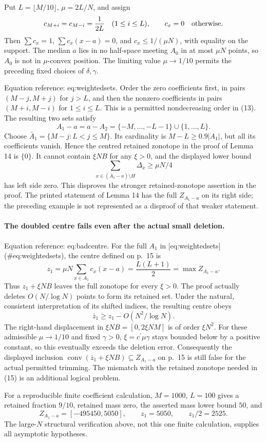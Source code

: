 \documentclass[10pt]{article}
\begin{document}
Put \(L=\lfloor M/10\rfloor\), \(\mu=2L/N\), and assign \[c_{M+i}=c_{M-i}=\frac1{2L}\quad(1\le i\le L),\qquad c_x=0
 \quad\hbox{otherwise}.\] Then \(\sum c_x=1\), \(\sum c_x(x-a)=0\), and \(c_x\le1/(\mu N)\), with equality on the support. The median \(a\) lies in no half-space meeting \(A_0\) in at most \(\mu N\) points, so \(A_0\) is not in \(\mu\)-convex position. The limiting value \(\mu\to1/10\) permits the preceding fixed choices of \(\delta,\gamma\).\par
Equation reference: eq:weightedsets. Order the zero coefficients first, in pairs \((M-j,M+j)\) for \(j>L\), and then the nonzero coefficients in pairs \((M+i,M-i)\) for \(1\le i\le L\). This is a permitted nondecreasing order in (13). The resulting two sets satisfy \[
 A_1-a=a-A_2=\{-M,\ldots,-L-1\}\cup\{1,\ldots,L\}.\] Choose \(\bar A_1=\{M-j:L<j\le M\}\). Its cardinality is \(M-L\ge0.9|A_1|\), but all its coefficients vanish. Hence the centred retained zonotope in the proof of Lemma 14 is \(\{0\}\). It cannot contain \(\xi NB\) for any \(\xi>0\), and the displayed lower bound \[\sum_{x\in(\bar A_1-a)\setminus H}\Delta_x\ge\mu N/4\] has left side zero. This disproves the stronger retained-zonotope assertion in the proof. The printed statement of Lemma 14 has the full \(Z_{A_1-a}\) on its right side; the preceding example is not represented as a disproof of that weaker statement.\par
\paragraph*{The doubled centre fails even after the actual small deletion.}\mbox{}\par
Equation reference: eq:badcentre. For the full \(A_1\) in [eq:weightedsets] (\#eq:weightedsets), the centre defined on p. 15 is \[
 z_1=\mu N\sum_{x\in A_1}c_x(x-a)=\frac{L(L+1)}2
       =\max Z_{A_1-a}.\] Thus \(z_1+\xi NB\) leaves the full zonotope for every \(\xi>0\). The proof actually deletes \(O(N/\log N)\) points to form its retained set. Under the natural, consistent interpretation of its shifted indices, the resulting centre obeys \[\bar z_1\ge z_1-O(N^2/\log N).\] The right-hand displacement in \(\xi NB=[0,2\xi NM]\) is of order \(\xi N^2\). For these admissible \(\mu\to1/10\) and fixed \(\gamma>0\), \(\xi=c^\prime\mu\gamma\) stays bounded below by a positive constant, so this eventually exceeds the deletion error. Consequently the displayed inclusion \(\operatorname{conv}(\bar z_1+\xi NB)\subseteq Z_{A_1-a}\) on p. 15 is still false for the actual permitted trimming. The mismatch with the retained zonotope needed in (15) is an additional logical problem.\par
For a reproducible finite coefficient calculation, \(M=1000\), \(L=100\) gives a retained fraction \(9/10\), retained mass zero, the asserted mass lower bound \(50\), and \[Z_{A_1-a}=[-495450,5050],\qquad z_1=5050,
 \qquad z_1/2=2525.\] The large-\(N\) structural verification above, not this one finite calculation, supplies all asymptotic hypotheses.\par
\end{document}
